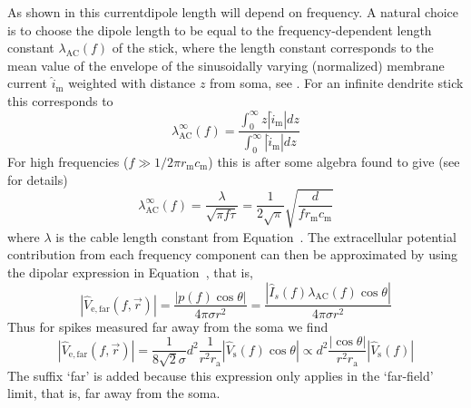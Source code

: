 As shown in  this current\ghtxt{-}dipole  length will depend on frequency. A natural choice is to choose the dipole length to be equal to the frequency-dependent length constant $\lambda_\mathrm{AC}(f)$ of the stick, where the length constant corresponds to the mean value of the envelope of the sinusoidally varying (normalized) membrane current $\hat{i}_\mathrm{m}$ weighted with distance $z$ from soma, see . For an infinite dendrite stick this corresponds to
%
\begin{equation}
  \lambda_\mathrm{AC}^\infty(f) = \frac{\int_0^\infty z |\hat{i}_\mathrm{m}| dz}{\int_0^\infty |\hat{i}_\mathrm{m}| dz} 
  \label{eq:Spikes:formula_lambda_ac}
\end{equation}
%
For high frequencies ($f \gg 1/2 \pi r_\mathrm{m} c_\mathrm{m}$) this is after some algebra found to give (see  for details)
%
\begin{equation}
 \lambda_\mathrm{AC}^\infty(f) =  \frac{\lambda}{\sqrt{\pi f \tau}} = 
  \frac{1}{2\sqrt{\pi}} \sqrt{\frac{d}{f r_\mathrm{m} c_\mathrm{m}}}
\label{eq:Spikes:approx_lambda_ac}
\end{equation}
%
where $\lambda$ is the cable length constant from Equation~. The extracellular potential contribution from each frequency component can then be approximated by using the dipolar expression in Equation~, that is,
\begin{equation}
  |\hat{V}_\mathrm{e,far}(f,\vec{r})| =  \frac{|p(f) \cos \theta|}{4 \pi \sigma r^2} 
                                            = \frac{| \hat{I}_{s}(f) \lambda_\mathrm{AC}(f) \cos \theta|}{4 \pi \sigma r^2}   
                                                                                        \label{eq:Spikes:Ve_far_1}
\end{equation}
Thus for spikes measured far away from the soma we find 
%  
\begin{equation}
  |\hat{V}_\mathrm{e,far}(f,\vec{r})|  = \frac{1}{8 \sqrt{2} \sigma} d^{2} \frac{1}{r^2  r_\mathrm{a}} 
      |\hat{V}_\mathrm{s}(f) \cos \theta | 
  \propto d^{2} \frac{|\cos \theta|}{r^2  r_\mathrm{a}} |\hat{V}_\mathrm{s}(f)| 
  \label{eq:Spikes:Ve_far_2}
\end{equation}
The suffix `far' is added because this expression only applies in the `far-field' limit, that is, far away from the soma. 
%


